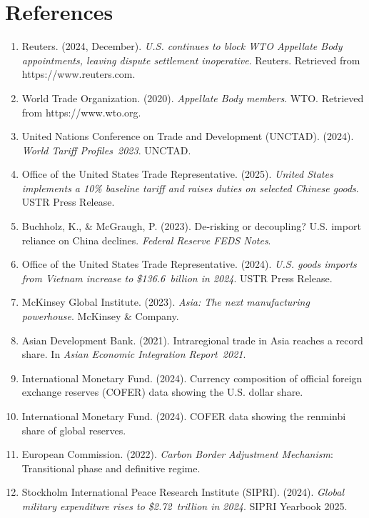 \documentclass{article}
\begin{document}
\section{References}
\begin{enumerate}
\item Reuters. (2024, December). \textit{U.S. continues to block WTO Appellate Body appointments, leaving dispute settlement inoperative}. Reuters. Retrieved from https://www.reuters.com.
\item World Trade Organization. (2020). \textit{Appellate Body members}. WTO. Retrieved from https://www.wto.org.
\item United Nations Conference on Trade and Development (UNCTAD). (2024). \textit{World Tariff Profiles 2023}. UNCTAD.
\item Office of the United States Trade Representative. (2025). \textit{United States implements a 10\% baseline tariff and raises duties on selected Chinese goods}. USTR Press Release.
\item Buchholz, K., \& McGraugh, P. (2023). De-risking or decoupling? U.S. import reliance on China declines. \textit{Federal Reserve FEDS Notes}.
\item Office of the United States Trade Representative. (2024). \textit{U.S. goods imports from Vietnam increase to \$136.6 billion in 2024}. USTR Press Release.
\item McKinsey Global Institute. (2023). \textit{Asia: The next manufacturing powerhouse}. McKinsey \& Company.
\item Asian Development Bank. (2021). Intraregional trade in Asia reaches a record share. In \textit{Asian Economic Integration Report 2021}.
\item International Monetary Fund. (2024). Currency composition of official foreign exchange reserves (COFER) data showing the U.S. dollar share.
\item International Monetary Fund. (2024). COFER data showing the renminbi share of global reserves.
\item European Commission. (2022). \textit{Carbon Border Adjustment Mechanism}: Transitional phase and definitive regime.
\item Stockholm International Peace Research Institute (SIPRI). (2024). \textit{Global military expenditure rises to \$2.72 trillion in 2024}. SIPRI Yearbook 2025.

\end{enumerate}
\end{document}
